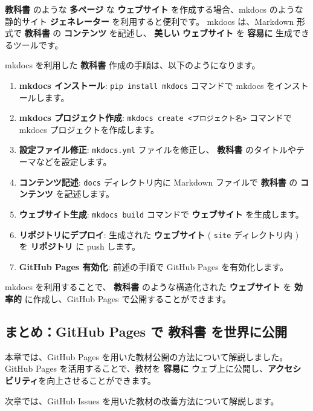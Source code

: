 \textbf{教科書} のような \textbf{多ページ} な \textbf{ウェブサイト} を作成する場合、mkdocs のような静的サイト \textbf{ジェネレーター} を利用すると便利です。
mkdocs は、Markdown 形式で \textbf{教科書} の \textbf{コンテンツ} を記述し、 \textbf{美しい} \textbf{ウェブサイト} を \textbf{容易に} 生成できるツールです。

mkdocs を利用した \textbf{教科書} 作成の手順は、以下のようになります。

\begin{enumerate}
    \item \textbf{mkdocs インストール}: \texttt{pip install mkdocs} コマンドで mkdocs をインストールします。
    \item \textbf{mkdocs プロジェクト作成}: \texttt{mkdocs create <プロジェクト名>} コマンドで mkdocs プロジェクトを作成します。
    \item \textbf{設定ファイル修正}: \texttt{mkdocs.yml} ファイルを修正し、 \textbf{教科書} のタイトルやテーマなどを設定します。
    \item \textbf{コンテンツ記述}: \texttt{docs} ディレクトリ内に Markdown ファイルで \textbf{教科書} の \textbf{コンテンツ} を記述します。
    \item \textbf{ウェブサイト生成}: \texttt{mkdocs build} コマンドで \textbf{ウェブサイト} を生成します。
    \item \textbf{リポジトリにデプロイ}: 生成された \textbf{ウェブサイト} ( \texttt{site} ディレクトリ内 ) を \textbf{リポジトリ} に push します。
    \item \textbf{GitHub Pages 有効化}: 前述の手順で GitHub Pages を有効化します。
\end{enumerate}

mkdocs を利用することで、 \textbf{教科書} のような構造化された \textbf{ウェブサイト} を \textbf{効率的} に作成し、GitHub Pages で公開することができます。

\subsection{まとめ：GitHub Pages で \textbf{教科書} を世界に公開}

本章では、GitHub Pages を用いた教材公開の方法について解説しました。
GitHub Pages を活用することで、教材を \textbf{容易に} ウェブ上に公開し、\textbf{アクセシビリティ}を向上させることができます。

次章では、GitHub Issues を用いた教材の改善方法について解説します。

